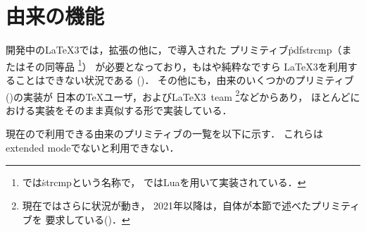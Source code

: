 \documentclass[a4paper,11pt,nomag,dvipdfmx]{jsarticle}
\begin{document}
\section{由来の機能}
開発中の\LaTeX 3では，\eTeX 拡張の他に，で導入された
プリミティブ\.{pdfstrcmp}（またはその同等品%
\footnote{では\.{strcmp}という名称で，
ではLuaを用いて実装されている．}）%
が必要となっており，もはや純粋な\eTeX ですら
\LaTeX 3を利用することはできない状況である (\cite{expl31,expl32,expl33})．
その他にも，由来のいくつかのプリミティブ(\cite{pdftexman})の実装が
日本の\TeX ユーザ，および\LaTeX3~team%
\footnote{%
  現在ではさらに状況が動き，
  2021年以降は，\LaTeXe 自体が本節で述べたプリミティブを
  要求している(\cite{l2e31})．
}などからあり，
ほとんどにおける実装をそのまま真似する形で実装している．

現在の\epTeX で利用できる由来のプリミティブの一覧を以下に示す．
これらはextended modeでないと利用できない．
\end{document}
